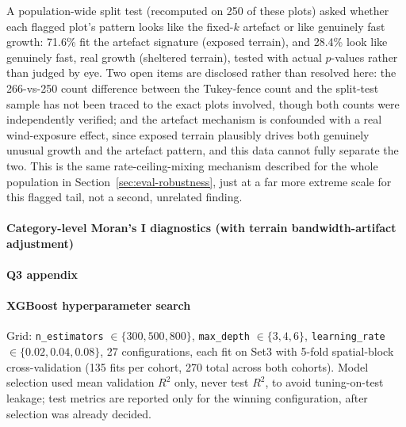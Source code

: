 \documentclass[logo,msc,ai]{infthesis}           %
\begin{document}
A population-wide split test (recomputed on 250 of these plots) asked whether each flagged
plot's pattern looks like the fixed-$k$ artefact or like genuinely fast growth: 71.6\% fit the
artefact signature (exposed terrain), and 28.4\% look like genuinely fast, real growth
(sheltered terrain), tested with actual $p$-values rather than judged by eye. Two open items are
disclosed rather than resolved here: the 266-vs-250 count difference between the Tukey-fence
count and the split-test sample has not been traced to the exact plots involved, though both
counts were independently verified; and the artefact mechanism is confounded with a real
wind-exposure effect, since exposed terrain plausibly drives both genuinely unusual growth and
the artefact pattern, and this data cannot fully separate the two. This is the same
rate-ceiling-mixing mechanism described for the whole population in
Section~\ref{sec:eval-robustness}, just at a far more extreme scale for this flagged tail,
not a second, unrelated finding.

\paragraph*{Category-level Moran's I diagnostics (with terrain bandwidth-artifact adjustment)}
\label{app:results-q2-category-morans-i}

\paragraph*{Q3 appendix}
\label{app:results-q3}

\paragraph*{XGBoost hyperparameter search}
\label{app:hyperparameters}
Grid: \texttt{n\_estimators} $\in \{300, 500, 800\}$, \texttt{max\_depth} $\in \{3, 4, 6\}$,
\texttt{learning\_rate} $\in \{0.02, 0.04, 0.08\}$, 27 configurations, each fit on Set3 with
5-fold spatial-block cross-validation (135 fits per cohort, 270 total across both cohorts).
Model selection used mean validation $R^2$ only, never test $R^2$, to avoid tuning-on-test
leakage; test metrics are reported only for the winning configuration, after selection was
already decided.
\end{document}
